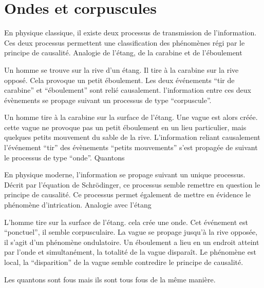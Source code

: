 
\section{Ondes et corpuscules}


En physique classique, il existe deux processus de transmission de l'information. Ces deux processus permettent une classification des phénomènes régi par le principe de causalité.
Analogie de l'étang, de la carabine et de l'éboulement

Un homme se trouve sur la rive d'un étang. Il tire à la carabine sur la rive opposé. Cela provoque un petit éboulement. Les deux événements “tir de carabine” et “éboulement” sont relié causalement. l'information entre ces deux évènements se propage suivant un processus de type “corpuscule”.

Un homme tire à la carabine sur la surface de l'étang. Une vague est alors créée. cette vague ne provoque pas un petit éboulement en un lieu particulier, mais quelques petits mouvement du sable de la rive. L'information reliant causalement l’événement “tir” des évènements “petits mouvements” s'est propagée de suivant le processus de type “onde”.
Quantons

En physique moderne, l'information se propage suivant un unique processus. Décrit par l'équation de Schrödinger, ce processus semble remettre en question le principe de causalité. Ce processus permet également de mettre en évidence le phénomène d'intrication.
Analogie avec l'étang

L'homme tire sur la surface de l'étang. cela crée une onde. Cet événement est “ponctuel”, il semble corpusculaire. La vague se propage jusqu'à la rive opposée, il s'agit d'un phénomène ondulatoire. Un éboulement a lieu en un endroit atteint par l'onde et simultanément, la totalité de la vague disparaît. Le phénomène est local, la “disparition” de la vague semble contredire le principe de causalité.

Les quantons sont fous mais ils sont tous fous de la même manière.


